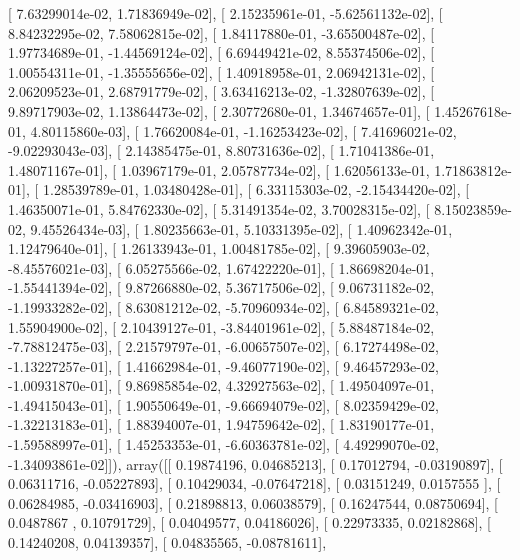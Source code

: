 \documentclass{article}
\begin{document}
       [  7.63299014e-02,   1.71836949e-02],
       [  2.15235961e-01,  -5.62561132e-02],
       [  8.84232295e-02,   7.58062815e-02],
       [  1.84117880e-01,  -3.65500487e-02],
       [  1.97734689e-01,  -1.44569124e-02],
       [  6.69449421e-02,   8.55374506e-02],
       [  1.00554311e-01,  -1.35555656e-02],
       [  1.40918958e-01,   2.06942131e-02],
       [  2.06209523e-01,   2.68791779e-02],
       [  3.63416213e-02,  -1.32807639e-02],
       [  9.89717903e-02,   1.13864473e-02],
       [  2.30772680e-01,   1.34674657e-01],
       [  1.45267618e-01,   4.80115860e-03],
       [  1.76620084e-01,  -1.16253423e-02],
       [  7.41696021e-02,  -9.02293043e-03],
       [  2.14385475e-01,   8.80731636e-02],
       [  1.71041386e-01,   1.48071167e-01],
       [  1.03967179e-01,   2.05787734e-02],
       [  1.62056133e-01,   1.71863812e-01],
       [  1.28539789e-01,   1.03480428e-01],
       [  6.33115303e-02,  -2.15434420e-02],
       [  1.46350071e-01,   5.84762330e-02],
       [  5.31491354e-02,   3.70028315e-02],
       [  8.15023859e-02,   9.45526434e-03],
       [  1.80235663e-01,   5.10331395e-02],
       [  1.40962342e-01,   1.12479640e-01],
       [  1.26133943e-01,   1.00481785e-02],
       [  9.39605903e-02,  -8.45576021e-03],
       [  6.05275566e-02,   1.67422220e-01],
       [  1.86698204e-01,  -1.55441394e-02],
       [  9.87266880e-02,   5.36717506e-02],
       [  9.06731182e-02,  -1.19933282e-02],
       [  8.63081212e-02,  -5.70960934e-02],
       [  6.84589321e-02,   1.55904900e-02],
       [  2.10439127e-01,  -3.84401961e-02],
       [  5.88487184e-02,  -7.78812475e-03],
       [  2.21579797e-01,  -6.00657507e-02],
       [  6.17274498e-02,  -1.13227257e-01],
       [  1.41662984e-01,  -9.46077190e-02],
       [  9.46457293e-02,  -1.00931870e-01],
       [  9.86985854e-02,   4.32927563e-02],
       [  1.49504097e-01,  -1.49415043e-01],
       [  1.90550649e-01,  -9.66694079e-02],
       [  8.02359429e-02,  -1.32213183e-01],
       [  1.88394007e-01,   1.94759642e-02],
       [  1.83190177e-01,  -1.59588997e-01],
       [  1.45253353e-01,  -6.60363781e-02],
       [  4.49299070e-02,  -1.34093861e-02]]), array([[ 0.19874196,  0.04685213],
       [ 0.17012794, -0.03190897],
       [ 0.06311716, -0.05227893],
       [ 0.10429034, -0.07647218],
       [ 0.03151249,  0.0157555 ],
       [ 0.06284985, -0.03416903],
       [ 0.21898813,  0.06038579],
       [ 0.16247544,  0.08750694],
       [ 0.0487867 ,  0.10791729],
       [ 0.04049577,  0.04186026],
       [ 0.22973335,  0.02182868],
       [ 0.14240208,  0.04139357],
       [ 0.04835565, -0.08781611],
\end{document}
